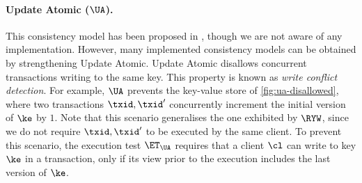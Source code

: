 \paragraph{Update Atomic ($\UA$).}
This consistency model has been proposed in \cite{framework-concur}, 
though we are not aware of any implementation. 
However, many implemented consistency models can be obtained by strengthening Update Atomic.
Update Atomic disallows concurrent transactions writing to the same key. 
This property is known as \emph{write conflict detection}.
For example, $\UA$ prevents the key-value store of \cref{fig:ua-disallowed},
where two transactions $\txid, \txid'$ concurrently increment the initial version of $\ke$ by $1$.
Note that this scenario generalises the one exhibited by $\RYW$, 
since we do not require $\txid, \txid'$ to be executed by the same client.
To prevent this scenario, the execution test $\ET_\UA$ requires that 
a client $\cl$ can write to key $\ke$ in a transaction,
only if its view prior to the execution includes the last version of $\ke$.

